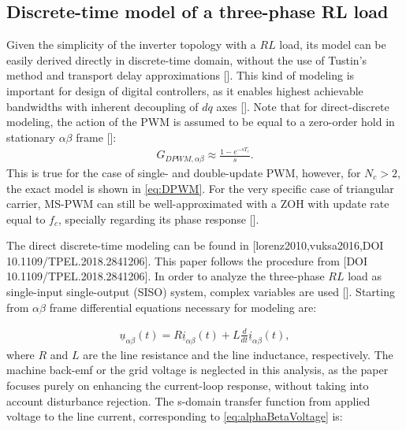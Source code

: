 \documentclass[journal]{IEEEtran}
\begin{document}
\subsection{Discrete-time model of a three-phase RL load}

Given the simplicity of the inverter topology with a $RL$ load, its model can be easily derived directly in discrete-time domain, without the use of Tustin's method and transport delay approximations []. This kind of modeling is important for design of digital controllers, as it enables highest achievable bandwidths with inherent decoupling of $dq$ axes []. 
Note that for direct-discrete modeling, the action of the PWM is assumed to be equal to a zero-order hold in stationary $\alpha \beta$ frame []:
\begin{equation}
\begin{aligned}
G_{DPWM,\alpha \beta} \approx \frac{1-e^{-sT_c}}{s}.
\label{eq:DPWMAlphaBeta} 
\end{aligned}    
\end{equation}
 This is true for the case of single- and double-update PWM, however, for $N_c>2$, the exact model is shown in \eqref{eq:DPWM}. For the very specific case of triangular carrier, MS-PWM can still be well-approximated with a ZOH with update rate equal to $f_c$, specially regarding its phase response [].

The direct discrete-time modeling can be found in [lorenz2010,vuksa2016,DOI 10.1109/TPEL.2018.2841206]. This paper follows the procedure from [DOI 10.1109/TPEL.2018.2841206].
In order to analyze the three-phase $RL$ load as single-input single-output (SISO) system, complex variables are used []. 
Starting from $\alpha \beta$ frame differential equations necessary for modeling are:

\begin{equation}
\begin{aligned}
\underline{u}_{\alpha \beta} (t) = R \underline{i}_{\alpha \beta} (t) + L \frac{d}{dt} \underline{i}_{\alpha \beta} (t),
\label{eq:alphaBetaVoltage} 
\end{aligned}    
\end{equation}
where $R$ and $L$ are the line resistance and the line inductance, respectively. The machine back-emf or the grid voltage is neglected in this analysis, as the paper focuses purely on enhancing the current-loop response, without taking into account disturbance rejection.
The s-domain transfer function from applied voltage to the line current, corresponding to \eqref{eq:alphaBetaVoltage} is:
\end{document}
